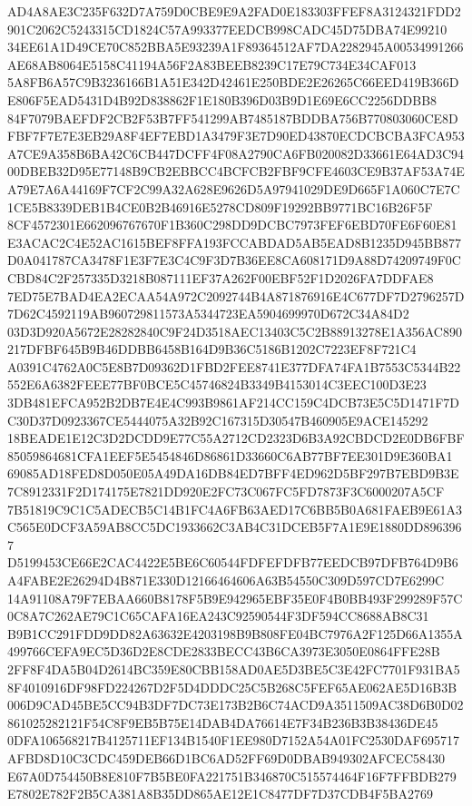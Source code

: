 \documentclass[UTF8,fontset=fandol,zihao=-4,a4paper]{ctexart}
\begin{document}
{{AD4A8AE3C235F632D7A759D0CBE9E9A2FAD0E183303FFEF8A3124321FDD2901C2062C5243315CD1824C57A993377EEDCB998CADC45D75DBA74E99210
34EE61A1D49CE70C852BBA5E93239A1F89364512AF7DA2282945A00534991266AE68AB8064E5158C41194A56F2A83BEEB8239C17E79C734E34CAF013
5A8FB6A57C9B3236166B1A51E342D42461E250BDE2E26265C66EED419B366DE806F5EAD5431D4B92D838862F1E180B396D03B9D1E69E6CC2256DDBB8
84F7079BAEFDF2CB2F53B7FF541299AB7485187BDDBA756B770803060CE8DFBF7F7E7E3EB29A8F4EF7EBD1A3479F3E7D90ED43870ECDCBCBA3FCA953
A7CE9A358B6BA42C6CB447DCFF4F08A2790CA6FB020082D33661E64AD3C9400DBEB32D95E77148B9CB2EBBCC4BCFCB2FBF9CFE4603CE9B37AF53A74E
A79E7A6A44169F7CF2C99A32A628E9626D5A97941029DE9D665F1A060C7E7C1CE5B8339DEB1B4CE0B2B46916E5278CD809F19292BB9771BC16B26F5F
8CF4572301E662096767670F1B360C298DD9DCBC7973FEF6EBD70FE6F60E81E3ACAC2C4E52AC1615BEF8FFA193FCCABDAD5AB5EAD8B1235D945BB877
D0A041787CA3478F1E3F7E3C4C9F3D7B36EE8CA608171D9A88D74209749F0CCBD84C2F257335D3218B087111EF37A262F00EBF52F1D2026FA7DDFAE8
7ED75E7BAD4EA2ECAA54A972C2092744B4A871876916E4C677DF7D2796257D7D62C4592119AB960729811573A5344723EA5904699970D672C34A84D2
03D3D920A5672E28282840C9F24D3518AEC13403C5C2B88913278E1A356AC890217DFBF645B9B46DDBB6458B164D9B36C5186B1202C7223EF8F721C4
A0391C4762A0C5E8B7D09362D1FBD2FEE8741E377DFA74FA1B7553C5344B22552E6A6382FEEE77BF0BCE5C45746824B3349B4153014C3EEC100D3E23
3DB481EFCA952B2DB7E4E4C993B9861AF214CC159C4DCB73E5C5D1471F7DC30D37D0923367CE5444075A32B92C167315D30547B460905E9ACE145292
18BEADE1E12C3D2DCDD9E77C55A2712CD2323D6B3A92CBDCD2E0DB6FBF85059864681CFA1EEF5E5454846D86861D33660C6AB77BF7EE301D9E360BA1
69085AD18FED8D050E05A49DA16DB84ED7BFF4ED962D5BF297B7EBD9B3E7C8912331F2D174175E7821DD920E2FC73C067FC5FD7873F3C6000207A5CF
7B51819C9C1C5ADECB5C14B1FC4A6FB63AED17C6BB5B0A681FAEB9E61A3C565E0DCF3A59AB8CC5DC1933662C3AB4C31DCEB5F7A1E9E1880DD8963967
D5199453CE66E2CAC4422E5BE6C60544FDFEFDFB77EEDCB97DFB764D9B6A4FABE2E26294D4B871E330D12166464606A63B54550C309D597CD7E6299C
14A91108A79F7EBAA660B8178F5B9E942965EBF35E0F4B0BB493F299289F57C0C8A7C262AE79C1C65CAFA16EA243C92590544F3DF594CC8688AB8C31
B9B1CC291FDD9DD82A63632E4203198B9B808FE04BC7976A2F125D66A1355A499766CEFA9EC5D36D2E8CDE2833BECC43B6CA3973E3050E0864FFE28B
2FF8F4DA5B04D2614BC359E80CBB158AD0AE5D3BE5C3E42FC7701F931BA58F4010916DF98FD224267D2F5D4DDDC25C5B268C5FEF65AE062AE5D16B3B
006D9CAD45BE5CC94B3DF7DC73E173B2B6C74ACD9A3511509AC38D6B0D02861025282121F54C8F9EB5B75E14DAB4DA76614E7F34B236B3B38436DE45
0DFA106568217B4125711EF134B1540F1EE980D7152A54A01FC2530DAF695717AFBD8D10C3CDC459DEB66D1BC6AD52FF69D0DBAB949302AFCEC58430
E67A0D754450B8E810F7B5BE0FA221751B346870C515574464F16F7FFBDB279E7802E782F2B5CA381A8B35DD865AE12E1C8477DF7D37CDB4F5BA2769
}}
\end{document}
